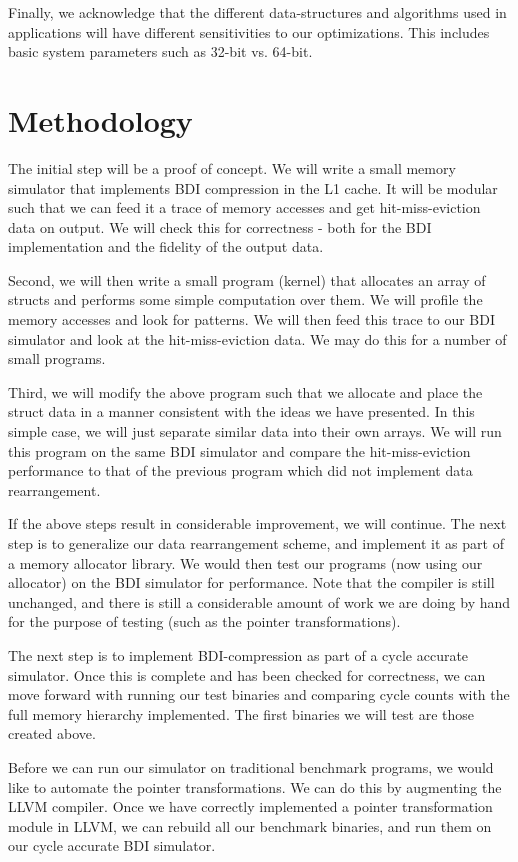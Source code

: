 \documentclass[pageno]{jpaper}
\begin{document}
Finally, we acknowledge that the different data-structures and algorithms used in applications will have different sensitivities to our optimizations. This includes basic system parameters such as 32-bit vs. 64-bit.

\section{Methodology}
The initial step will be a proof of concept. We will write a small memory simulator that implements BDI compression in the L1 cache. It will be modular such that we can feed it a trace of memory accesses and get hit-miss-eviction data on output. We will check this for correctness - both for the BDI implementation and the fidelity of the output data.

Second, we will then write a small program (kernel) that allocates an array of structs and performs some simple computation over them. We will profile the memory accesses and look for patterns. We will then feed this trace to our BDI simulator and look at the hit-miss-eviction data. We may do this for a number of small programs.

Third, we will modify the above program such that we allocate and place the struct data in a manner consistent with the ideas we have presented. In this simple case, we will just separate similar data into their own arrays. We will run this program on the same BDI simulator and compare the hit-miss-eviction performance to that of the previous program which did not implement data rearrangement.

If the above steps result in considerable improvement, we will continue. The next step is to generalize our data rearrangement scheme, and implement it as part of a memory allocator library. We would then test our programs (now using our allocator) on the BDI simulator for performance. Note that the compiler is still unchanged, and there is still a considerable amount of work we are doing by hand for the purpose of testing (such as the pointer transformations).

The next step is to implement BDI-compression as part of a cycle accurate simulator. Once this is complete and has been checked for correctness, we can move forward with running our test binaries and comparing cycle counts with the full memory hierarchy implemented. The first binaries we will test are those created above.

Before we can run our simulator on traditional benchmark programs, we would like to automate the pointer transformations. We can do this by augmenting the LLVM compiler. Once we have correctly implemented a pointer transformation module in LLVM, we can rebuild all our benchmark binaries, and run them on our cycle accurate BDI simulator.
\end{document}
